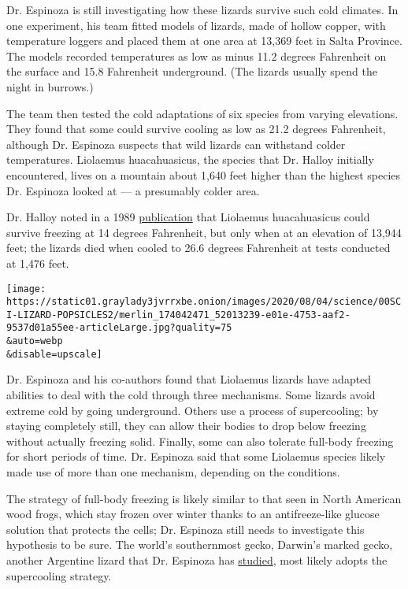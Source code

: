 Dr. Espinoza is still investigating how these lizards survive such cold
climates. In one experiment, his team fitted models of lizards, made of
hollow copper, with temperature loggers and placed them at one area at
13,369 feet in Salta Province. The models recorded temperatures as low
as minus 11.2 degrees Fahrenheit on the surface and 15.8 Fahrenheit
underground. (The lizards usually spend the night in burrows.)

The team then tested the cold adaptations of six species from varying
elevations. They found that some could survive cooling as low as 21.2
degrees Fahrenheit, although Dr. Espinoza suspects that wild lizards can
withstand colder temperatures. Liolaemus huacahuasicus, the species that
Dr. Halloy initially encountered, lives on a mountain about 1,640 feet
higher than the highest species Dr. Espinoza looked at --- a presumably
colder area.

Dr. Halloy noted in a 1989
\href{https://scholarspace.manoa.hawaii.edu/bitstream/10125/1214/v43n2-170-184.pdf}{publication}
that Liolaemus huacahuasicus could survive freezing at 14 degrees
Fahrenheit, but only when at an elevation of 13,944 feet; the lizards
died when cooled to 26.6 degrees Fahrenheit at tests conducted at 1,476
feet.

\texttt{[image: https://static01.graylady3jvrrxbe.onion/images/2020/08/04/science/00SCI-LIZARD-POPSICLES2/merlin\_174042471\_52013239-e01e-4753-aaf2-9537d01a55ee-articleLarge.jpg?quality=75\\\&auto=webp\\\&disable=upscale]}

Dr. Espinoza and his co-authors found that Liolaemus lizards have
adapted abilities to deal with the cold through three mechanisms. Some
lizards avoid extreme cold by going underground. Others use a process of
supercooling; by staying completely still, they can allow their bodies
to drop below freezing without actually freezing solid. Finally, some
can also tolerate full-body freezing for short periods of time. Dr.
Espinoza said that some Liolaemus species likely made use of more than
one mechanism, depending on the conditions.

The strategy of full-body freezing is likely similar to that seen in
North American wood frogs, which stay frozen over winter thanks to an
antifreeze-like glucose solution that protects the cells; Dr. Espinoza
still needs to investigate this hypothesis to be sure. The world's
southernmost gecko, Darwin's marked gecko, another Argentine lizard that
Dr. Espinoza has
\href{https://www.sciencedirect.com/science/article/abs/pii/S030645651300020X}{studied},
most likely adopts the supercooling strategy.

